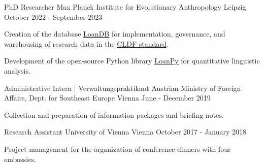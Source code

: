 \begin{cventries}

  \cventry
    {PhD Researcher} %
    {Max Planck Institute for Evolutionary Anthropology} %
    {Leipzig} %
    {October 2022 - September 2023} %
    {
      \begin{cvitems} %
      \item{Creation of the database \underline{\href{https://github.com/LoanDB/}{LoanDB}} for implementation, governance, and warehousing of research data in the \underline{\href{https://cldf.clld.org/}{CLDF standard}}.}
      \item{Development of the open-source Python library \underline{\href{https://pypi.org/project/loanpy/}{LoanPy}} for quantitative linguistic analysis.}
      \end{cvitems}
    }
    
  \cventry
    {Administrative Intern | Verwaltungspraktikant} %
    {Austrian Ministry of Foreign Affairs, Dept. for Southeast Europe} %
    {Vienna} %
    {June - December 2019} %
    {
      \begin{cvitems} %
        \item{Collection and preparation of information packages and briefing notes.}
      \end{cvitems}
    }

  \cventry
    {Research Assistant} %
    {University of Vienna} %
    {Vienna} %
    {October 2017 - January 2018} %
    {
    \begin{cvitems}
    \item{Project management for the organization of conference dinners with four embassies.}
    \end{cvitems}
    }
    

        
\end{cventries}
